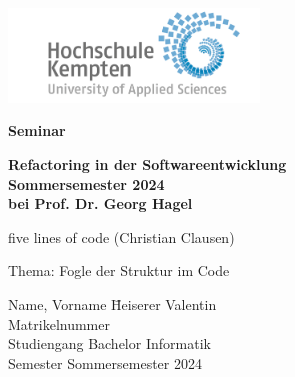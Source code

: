 \thispagestyle{empty}



\vspace*{-20mm}
\begin{flushright}
\includegraphics[width=0.5\textwidth]{Bilder/LogoHS.png}
\end{flushright}


\vspace*{2cm}

\begin{center}
{\Large \textbf{Seminar}}\\ 



\vspace{1cm}

{\Large \bfseries Refactoring in der Softwareentwicklung\\ 
	Sommersemester 2024\\
	bei Prof. Dr. Georg Hagel\\}

\vspace*{1cm}

{\large five lines of code (Christian Clausen)\\[1mm]}

\vspace{1.5cm}

{\large Thema: Fogle der Struktur im Code}\\[40mm]

\end{center}

\vfill

\parbox{120mm}{
\begin{tabbing}
Name, Vorname \hspace{2cm} \= Heiserer Valentin\\
Matrikelnummer             \\[4mm]
Studiengang                  \> Bachelor Informatik\\
Semester                  \> Sommersemester 2024\\
\end{tabbing}
}

